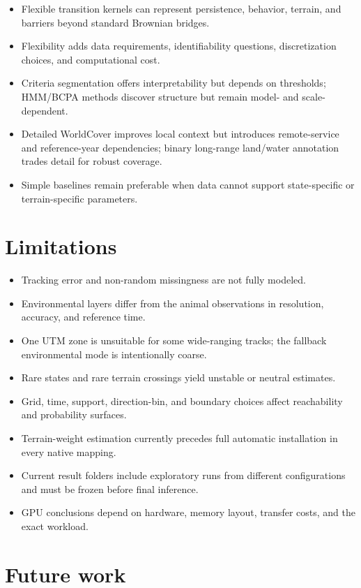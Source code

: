 \begin{itemize}
  \item Flexible transition kernels can represent persistence, behavior, terrain, and barriers beyond standard Brownian bridges.
  \item Flexibility adds data requirements, identifiability questions, discretization choices, and computational cost.
  \item Criteria segmentation offers interpretability but depends on thresholds; HMM/BCPA methods discover structure but remain model- and scale-dependent.
  \item Detailed WorldCover improves local context but introduces remote-service and reference-year dependencies; binary long-range land/water annotation trades detail for robust coverage.
  \item Simple baselines remain preferable when data cannot support state-specific or terrain-specific parameters.
\end{itemize}

\section{Limitations}

\begin{itemize}
  \item Tracking error and non-random missingness are not fully modeled.
  \item Environmental layers differ from the animal observations in resolution, accuracy, and reference time.
  \item One UTM zone is unsuitable for some wide-ranging tracks; the fallback environmental mode is intentionally coarse.
  \item Rare states and rare terrain crossings yield unstable or neutral estimates.
  \item Grid, time, support, direction-bin, and boundary choices affect reachability and probability surfaces.
  \item Terrain-weight estimation currently precedes full automatic installation in every native mapping.
  \item Current result folders include exploratory runs from different configurations and must be frozen before final inference.
  \item GPU conclusions depend on hardware, memory layout, transfer costs, and the exact workload.
\end{itemize}

\section{Future work}

